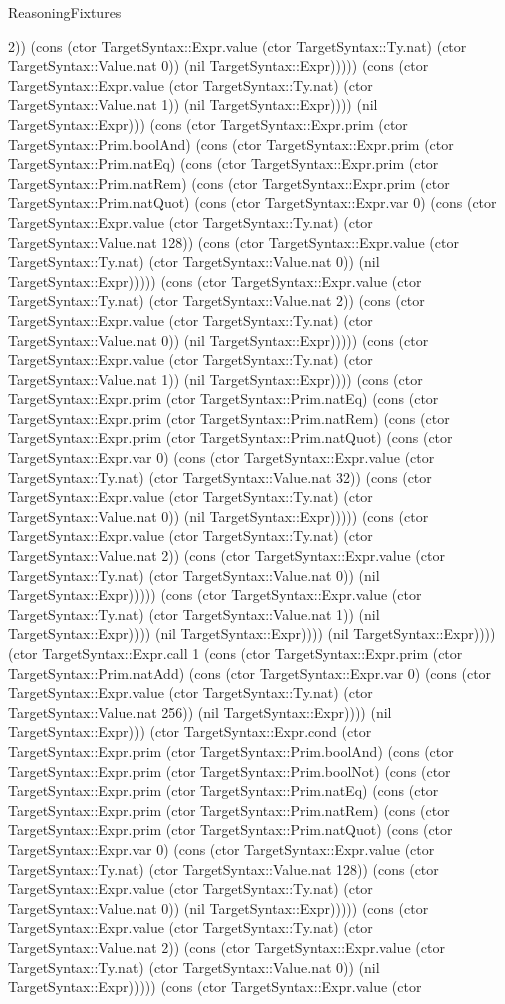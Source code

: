 \begin{lexlean}{ReasoningFixtures}
\begin{semanticmodule}
{2)) (cons (ctor TargetSyntax::Expr.value (ctor TargetSyntax::Ty.nat) (ctor TargetSyntax::Value.nat 0)) (nil TargetSyntax::Expr))))) (cons (ctor TargetSyntax::Expr.value (ctor TargetSyntax::Ty.nat) (ctor TargetSyntax::Value.nat 1)) (nil TargetSyntax::Expr)))) (nil TargetSyntax::Expr))) (cons (ctor TargetSyntax::Expr.prim (ctor TargetSyntax::Prim.boolAnd) (cons (ctor TargetSyntax::Expr.prim (ctor TargetSyntax::Prim.natEq) (cons (ctor TargetSyntax::Expr.prim (ctor TargetSyntax::Prim.natRem) (cons (ctor TargetSyntax::Expr.prim (ctor TargetSyntax::Prim.natQuot) (cons (ctor TargetSyntax::Expr.var 0) (cons (ctor TargetSyntax::Expr.value (ctor TargetSyntax::Ty.nat) (ctor TargetSyntax::Value.nat 128)) (cons (ctor TargetSyntax::Expr.value (ctor TargetSyntax::Ty.nat) (ctor TargetSyntax::Value.nat 0)) (nil TargetSyntax::Expr))))) (cons (ctor TargetSyntax::Expr.value (ctor TargetSyntax::Ty.nat) (ctor TargetSyntax::Value.nat 2)) (cons (ctor TargetSyntax::Expr.value (ctor TargetSyntax::Ty.nat) (ctor TargetSyntax::Value.nat 0)) (nil TargetSyntax::Expr))))) (cons (ctor TargetSyntax::Expr.value (ctor TargetSyntax::Ty.nat) (ctor TargetSyntax::Value.nat 1)) (nil TargetSyntax::Expr)))) (cons (ctor TargetSyntax::Expr.prim (ctor TargetSyntax::Prim.natEq) (cons (ctor TargetSyntax::Expr.prim (ctor TargetSyntax::Prim.natRem) (cons (ctor TargetSyntax::Expr.prim (ctor TargetSyntax::Prim.natQuot) (cons (ctor TargetSyntax::Expr.var 0) (cons (ctor TargetSyntax::Expr.value (ctor TargetSyntax::Ty.nat) (ctor TargetSyntax::Value.nat 32)) (cons (ctor TargetSyntax::Expr.value (ctor TargetSyntax::Ty.nat) (ctor TargetSyntax::Value.nat 0)) (nil TargetSyntax::Expr))))) (cons (ctor TargetSyntax::Expr.value (ctor TargetSyntax::Ty.nat) (ctor TargetSyntax::Value.nat 2)) (cons (ctor TargetSyntax::Expr.value (ctor TargetSyntax::Ty.nat) (ctor TargetSyntax::Value.nat 0)) (nil TargetSyntax::Expr))))) (cons (ctor TargetSyntax::Expr.value (ctor TargetSyntax::Ty.nat) (ctor TargetSyntax::Value.nat 1)) (nil TargetSyntax::Expr)))) (nil TargetSyntax::Expr)))) (nil TargetSyntax::Expr)))) (ctor TargetSyntax::Expr.call 1 (cons (ctor TargetSyntax::Expr.prim (ctor TargetSyntax::Prim.natAdd) (cons (ctor TargetSyntax::Expr.var 0) (cons (ctor TargetSyntax::Expr.value (ctor TargetSyntax::Ty.nat) (ctor TargetSyntax::Value.nat 256)) (nil TargetSyntax::Expr)))) (nil TargetSyntax::Expr))) (ctor TargetSyntax::Expr.cond (ctor TargetSyntax::Expr.prim (ctor TargetSyntax::Prim.boolAnd) (cons (ctor TargetSyntax::Expr.prim (ctor TargetSyntax::Prim.boolNot) (cons (ctor TargetSyntax::Expr.prim (ctor TargetSyntax::Prim.natEq) (cons (ctor TargetSyntax::Expr.prim (ctor TargetSyntax::Prim.natRem) (cons (ctor TargetSyntax::Expr.prim (ctor TargetSyntax::Prim.natQuot) (cons (ctor TargetSyntax::Expr.var 0) (cons (ctor TargetSyntax::Expr.value (ctor TargetSyntax::Ty.nat) (ctor TargetSyntax::Value.nat 128)) (cons (ctor TargetSyntax::Expr.value (ctor TargetSyntax::Ty.nat) (ctor TargetSyntax::Value.nat 0)) (nil TargetSyntax::Expr))))) (cons (ctor TargetSyntax::Expr.value (ctor TargetSyntax::Ty.nat) (ctor TargetSyntax::Value.nat 2)) (cons (ctor TargetSyntax::Expr.value (ctor TargetSyntax::Ty.nat) (ctor TargetSyntax::Value.nat 0)) (nil TargetSyntax::Expr))))) (cons (ctor TargetSyntax::Expr.value (ctor }
\end{semanticmodule}
\end{lexlean}
